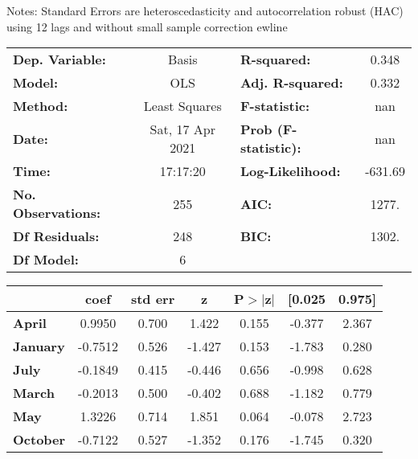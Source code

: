 Notes: \newline
 [1] Standard Errors are heteroscedasticity and autocorrelation robust (HAC) using 12 lags and without small sample correction
ewline\begin{center}
\begin{tabular}{lclc}
\toprule
\textbf{Dep. Variable:}    &      Basis       & \textbf{  R-squared:         } &     0.348   \\
\textbf{Model:}            &       OLS        & \textbf{  Adj. R-squared:    } &     0.332   \\
\textbf{Method:}           &  Least Squares   & \textbf{  F-statistic:       } &       nan   \\
\textbf{Date:}             & Sat, 17 Apr 2021 & \textbf{  Prob (F-statistic):} &      nan    \\
\textbf{Time:}             &     17:17:20     & \textbf{  Log-Likelihood:    } &   -631.69   \\
\textbf{No. Observations:} &         255      & \textbf{  AIC:               } &     1277.   \\
\textbf{Df Residuals:}     &         248      & \textbf{  BIC:               } &     1302.   \\
\textbf{Df Model:}         &           6      & \textbf{                     } &             \\
\bottomrule
\end{tabular}
\begin{tabular}{lcccccc}
                 & \textbf{coef} & \textbf{std err} & \textbf{z} & \textbf{P$> |$z$|$} & \textbf{[0.025} & \textbf{0.975]}  \\
\midrule
\textbf{April}   &       0.9950  &        0.700     &     1.422  &         0.155        &       -0.377    &        2.367     \\
\textbf{January} &      -0.7512  &        0.526     &    -1.427  &         0.153        &       -1.783    &        0.280     \\
\textbf{July}    &      -0.1849  &        0.415     &    -0.446  &         0.656        &       -0.998    &        0.628     \\
\textbf{March}   &      -0.2013  &        0.500     &    -0.402  &         0.688        &       -1.182    &        0.779     \\
\textbf{May}     &       1.3226  &        0.714     &     1.851  &         0.064        &       -0.078    &        2.723     \\
\textbf{October} &      -0.7122  &        0.527     &    -1.352  &         0.176        &       -1.745    &        0.320     \\

\end{tabular}
\end{center}
